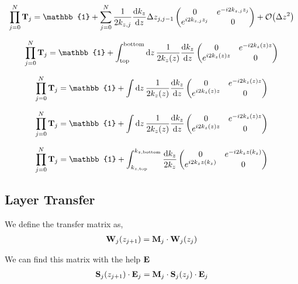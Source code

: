 \begin{align*}
	\prod_{j=0}^N \vb{T}_j = \mathbb{1} + \sum_{j=0}^N\frac{1}{2k_{z,j}}\dv{k_{z}}{z} \Delta z_{j,j-1}\pmqty{
	0                 &
	e^{-i2k_{z,j}z_j}   \\
	e^{ i2k_{z,j}z_j} &
	0} + \mathcal{O}\pqty{\Delta z^2}
\end{align*}

\begin{align*}
	\prod_{j=0}^N \vb{T}_j = \mathbb{1} + \int_\text{top}^\text{bottom} \dd{z} \frac{1}{2k_{z}\pqty{z}}\dv{k_{z}}{z} \pmqty{
	0                     &
	e^{-i2k_{z}\pqty{z}z}   \\
	e^{ i2k_{z}\pqty{z}z} &
	0}
\end{align*}

\begin{align*}
	\prod_{j=0}^N \vb{T}_j = \mathbb{1} + \int \dd{z} \frac{1}{2k_{z}\pqty{z}}\dv{k_{z}}{z} \pmqty{
	0                     &
	e^{-i2k_{z}\pqty{z}z}   \\
	e^{ i2k_{z}\pqty{z}z} &
	0}
\end{align*}

\begin{align*}
	\prod_{j=0}^N \vb{T}_j = \mathbb{1} + \int \dd{z} \frac{1}{2k_{z}\pqty{z}}\dv{k_{z}}{z} \pmqty{
	0                     &
	e^{-i2k_{z}\pqty{z}z}   \\
	e^{ i2k_{z}\pqty{z}z} &
	0}
\end{align*}

\begin{align*}
	\prod_{j=0}^N \vb{T}_j = \mathbb{1} + \int_{k_{z,\text{top}}}^{k_{z,\text{bottom}}}  \frac{\dd{k_z}}{2k_{z}} \pmqty{
	0                         &
	e^{-i2k_{z}z\pqty{k_{z}}}   \\
	e^{ i2k_{z}z\pqty{k_{z}}} &
	0}
\end{align*}




\subsection{Layer Transfer} %
\label{sub:layer_transfer}

We define the transfer matrix as,
\begin{align*}
	\vb{W}_j\pqty{z_{j+1}} = \vb{M}_j \cdot \vb{W}_j\pqty{z_{j}}
\end{align*}

We can find this matrix with the help $\vb{E}$
\begin{align*}
	\vb{S}_j\pqty{z_{j+1}}\cdot \vb{E}_j = \vb{M}_j \cdot \vb{S}_j\pqty{z_{j}}\cdot \vb{E}_j
\end{align*}

